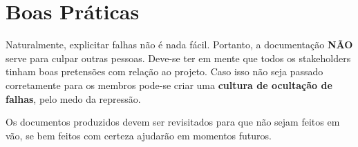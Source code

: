\documentclass[a4paper, 12pt]{article}
\begin{document}
	\section{Boas Práticas}
	Naturalmente, explicitar falhas não é nada fácil. Portanto, a documentação \textbf{NÃO} serve para culpar outras pessoas. Deve-se ter em mente que todos os stakeholders tinham boas pretensões com relação ao projeto. Caso isso não seja passado corretamente para os membros pode-se criar uma \textbf{cultura de ocultação de falhas}, pelo medo da repressão.
	
	Os documentos produzidos devem ser revisitados para que não sejam feitos em vão, se bem feitos com certeza ajudarão em momentos futuros.

	
\end{document}
